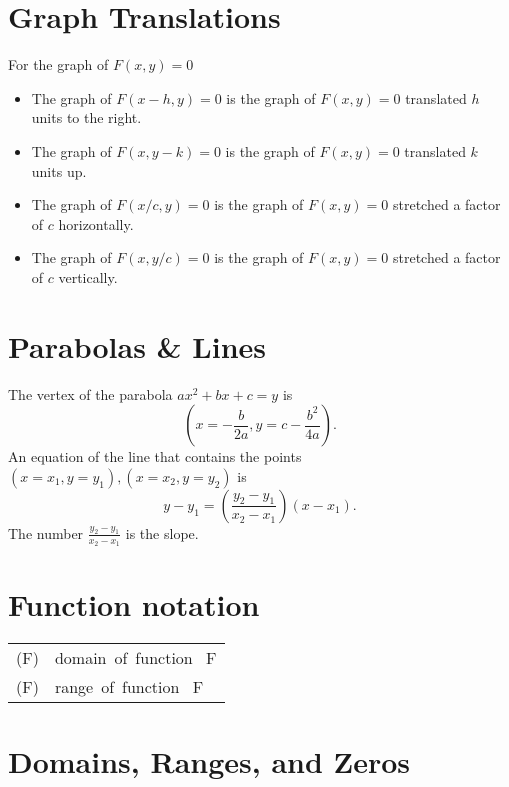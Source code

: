 \documentclass[letterpaper,landscape,9pt,fleqn]{extarticle}
\newcommand{\dom}{\mathrm{dom}}
\newcommand{\range}{\mathrm{range}}
\begin{document}
\begin{multicols*}{3}
\section*{Graph Translations}
\begin{minipage}[c]{0.3333333333333\textwidth}
For the graph of $F(x,y) = 0$  
\begin{itemize}
 \item The graph of $F(x-h,y)=0$ is the graph of $F(x,y) = 0$ translated $h$ units to the right. 
 
 \item The graph of $F(x,y-k)=0$ is the graph of $F(x,y) = 0$ translated $k$ units up. 
 
 \item The graph of $F(x/c,y)=0$ is the graph of $F(x,y) = 0$ stretched a factor of $c$ horizontally. 
 
 \item The graph of $F(x,y/c)=0$ is the graph of $F(x,y) = 0$ stretched a factor of $c$ vertically.
 \end{itemize}
\end{minipage}

\section*{Parabolas \& Lines}
\begin{minipage}[c]{0.3333333333333\textwidth}
The vertex of the parabola $a x^2 + b x + c = y$ is
\[
   \left(x = -\frac{b}{2 a}, y = c-\frac{{{b}^{2}}}{4 a} \right).
\]
An equation of the line that contains the points
\( (x=x_1, y = y_1), (x=x_2, y = y_2) \) is
\[
  y - y_1 = \left(\frac{y_2-y_1}{x_2-x_1} \right) (x - x_1).
\]
The number \(\frac{y_2-y_1}{x_2-x_1} \) is the slope.
\end{minipage}




\section*{Function notation}
\begin{tabular}{|L | L|} \hline 
    \dom(F) &   \mbox{domain of function } F \\
    \range(F) &   \mbox{range of function } F \\ \hline
 \end{tabular}

\section*{Domains, Ranges, and Zeros}



\end{multicols*}
\end{document}
